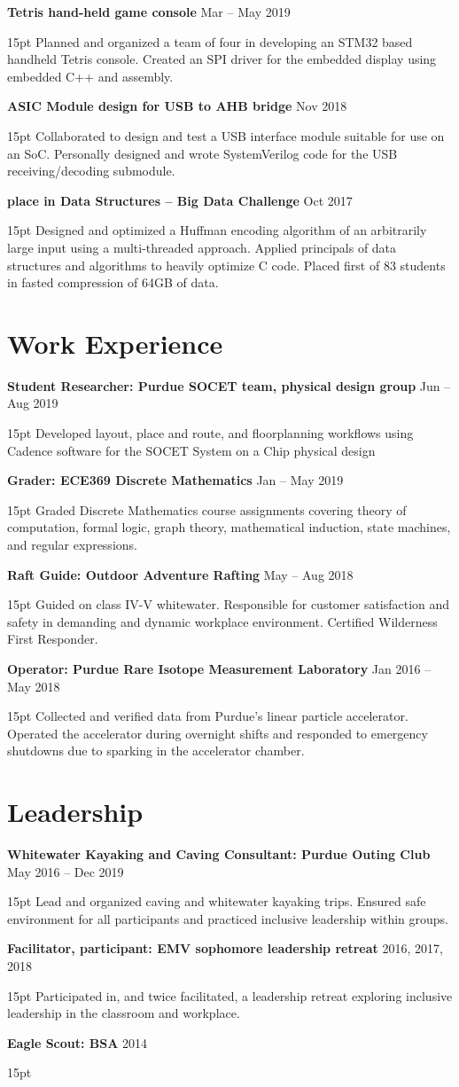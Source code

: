 \documentclass[10pt,letterpaper]{article}
\newcommand{\resumeItem}[3]{
	\textbf{#1} \hfill #2\\
	\begin{adjustwidth}{15pt}{}
	#3
	\end{adjustwidth}
}
\begin{document}
\resumeItem
{Tetris hand-held game console}
{Mar -- May 2019}
{Planned and organized a team of four in developing an STM32 based handheld Tetris console. Created an SPI driver for the embedded display using embedded C++ and assembly.}

\resumeItem
{ASIC Module design for USB to AHB bridge}
{Nov 2018}
{Collaborated to design and test a USB interface module suitable for use on an SoC. Personally designed and wrote SystemVerilog code for the USB receiving/decoding submodule.}


\resumeItem
{ place in Data Structures -- Big Data Challenge}
{Oct 2017}
{Designed and optimized a Huffman encoding algorithm of an arbitrarily large input using a multi-threaded approach. Applied principals of data structures and algorithms to heavily optimize C code. Placed first of 83 students in fasted compression of 64GB of data.}


\section*{Work Experience}
\resumeItem
{Student Researcher: Purdue SOCET team, physical design group}
{Jun -- Aug 2019}
{Developed layout, place and route, and floorplanning workflows using Cadence software for the SOCET System on a Chip physical design}

\resumeItem
{Grader: ECE369 Discrete Mathematics}
{Jan -- May 2019}
{Graded Discrete Mathematics course assignments covering theory of computation, formal logic, graph theory, mathematical induction, state machines, and regular expressions.}

\resumeItem
{Raft Guide: Outdoor Adventure Rafting}
{May -- Aug 2018}
{Guided on class IV-V whitewater. Responsible for customer satisfaction and safety in demanding and dynamic workplace environment. Certified Wilderness First Responder.}

\resumeItem
{Operator: Purdue Rare Isotope Measurement Laboratory}
{Jan 2016 -- May 2018}
{Collected and verified data from Purdue's linear particle accelerator. Operated the accelerator during overnight shifts and responded to emergency shutdowns due to sparking in the accelerator chamber.}


\section*{Leadership}
\resumeItem
{Whitewater Kayaking and Caving Consultant: Purdue Outing Club}
{May 2016 -- Dec 2019}
{Lead and organized caving and whitewater kayaking trips. Ensured safe environment for all participants and practiced inclusive leadership within groups.}

\resumeItem
{Facilitator, participant: EMV sophomore leadership retreat}
{2016, 2017, 2018}
{Participated in, and twice facilitated, a leadership retreat exploring inclusive leadership in the classroom and workplace.}

\resumeItem
{Eagle Scout: BSA}
{2014}
{}
\end{document}
